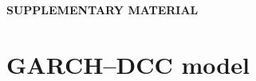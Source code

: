 \documentclass[12pt]{article}
\newcommand{\E}{\mathrm{E}}
\newcommand{\e}{\mathrm{e}}
\newcommand{\cov}{\mathrm{cov}}
\newcommand{\eps}{\epsilon}
\newcommand{\Ex}{{\cal E}}
\begin{document}

\bigskip
\begin{center}
{\large\bf SUPPLEMENTARY MATERIAL}
\end{center}

\appendix
\renewcommand*{\thesection}{\Alph{section}}

\section{GARCH--DCC model}\label{garchdcc}
\end{document}
